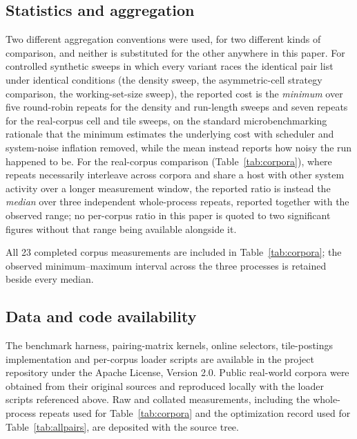 \subsection*{Statistics and aggregation}

Two different aggregation conventions were used, for two different kinds of comparison, and neither is
substituted for the other anywhere in this paper. For controlled synthetic sweeps in which every
variant races the identical pair list under identical conditions (the density sweep, the
asymmetric-cell strategy comparison, the working-set-size sweep), the reported cost is the
\emph{minimum} over five round-robin repeats for the density and run-length sweeps and seven repeats
for the real-corpus cell and tile sweeps, on the standard
microbenchmarking rationale that the minimum estimates the underlying cost with scheduler and
system-noise inflation removed, while the mean instead reports how noisy the run happened to be. For
the real-corpus comparison (Table~\ref{tab:corpora}), where repeats necessarily interleave across corpora and share a
host with other system activity over a longer measurement window, the reported ratio is instead the
\emph{median} over three independent whole-process repeats, reported together
with the observed range; no per-corpus ratio in this paper is quoted to two significant figures without
that range being available alongside it.

All 23 completed corpus measurements are included in Table~\ref{tab:corpora}; the observed
minimum--maximum interval across the three processes is retained beside every median.

\subsection*{Data and code availability}

The benchmark harness, pairing-matrix kernels, online selectors, tile-postings implementation and
per-corpus loader scripts are available in the project repository under the Apache License, Version
2.0. Public real-world corpora were obtained from their original sources and reproduced locally with
the loader scripts referenced above. Raw and collated measurements, including the whole-process
repeats used for Table~\ref{tab:corpora} and the optimization record used for
Table~\ref{tab:allpairs}, are deposited with the source tree.
